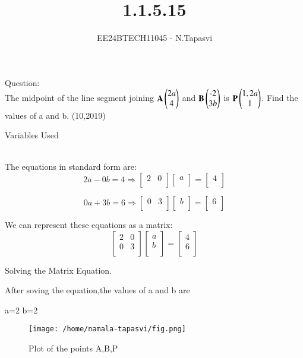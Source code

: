 \documentclass[journal]{IEEEtran}
\begin{document}

\vspace{3cm}

\title{1.1.5.15}
\author{EE24BTECH11045 - N.Tapasvi}
{\let\newpage\relax\maketitle}
Question:\\
The midpoint of the line segment joining $\mathbf{A}\begin{pmatrix}2a\\4\end{pmatrix}$ and $\mathbf{B}\begin{pmatrix}\text{-}2\\3b\end{pmatrix}$ is $\mathbf{P}\begin{pmatrix}1, 2a\\1\end{pmatrix}$. Find the values of a and b.
\hfill (10,2019)
\\
\solution
\begin{table}[h!]    
  \centering
  
  \caption{Variables Used}
  \label{tab1-1.9-6}
\end{table}\\
The equations in standard form are:
\[
2a - 0b = 4 \Rightarrow
\begin{bmatrix}
2 & 0 \\
\end{bmatrix}
\begin{bmatrix}
a \\
\end{bmatrix}
=
\begin{bmatrix}
4 \\
\end{bmatrix}
\]

\[
0a + 3b = 6 \Rightarrow
\begin{bmatrix}
0 & 3 \\
\end{bmatrix}
\begin{bmatrix}
b \\
\end{bmatrix}
=
\begin{bmatrix}
6 \\
\end{bmatrix}
\]

We can represent these equations as a matrix:
\[
\begin{bmatrix}
2 & 0 \\
0 & 3 \\
\end{bmatrix}
\begin{bmatrix}
a \\
b \\
\end{bmatrix}
=
\begin{bmatrix}
4 \\
6 \\
\end{bmatrix}
\]

Solving the Matrix Equation.

After soving the equation,the values of a and b are

a=2
b=2
\begin{figure}[h!]
   \centering
   \texttt{[image: /home/namala-tapasvi/fig.png]}
   \caption{Plot of the points A,B,P}
   \label{stemplot}
\end{figure}
\end{document}
